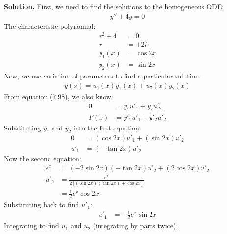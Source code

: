 \documentclass{article}
\begin{document}
\textbf{Solution.} First, we need to find the solutions to the homogeneous ODE:
\begin{equation*}
\begin{aligned}
	y'' + 4y = 0
\end{aligned}
\end{equation*}
The characteristic polynomial:
\begin{equation*}
\begin{aligned}
	r^2 + 4 &= 0 \\
	r &= \pm 2i \\
	y_1(x) &= \cos 2x \\
	y_2(x) &= \sin 2x
\end{aligned}
\end{equation*}
Now, we use variation of parameters to find a particular solution:
\begin{equation*}
\begin{aligned}
	y(x) = u_1(x)y_1(x) + u_2(x)y_2(x)
\end{aligned}
\end{equation*}
From equation (7.98), we also know:
\begin{equation*}
\begin{aligned}
	0 &= y_1u'_1 + y_2u'_2 \\
	F(x) &= y'_1u'_1 + y'_2u'_2
\end{aligned}
\end{equation*}
Substituting $y_1$ and $y_2$ into the first equation:
\begin{equation*}
\begin{aligned}
	0 &= (\cos 2x)u'_1 + (\sin 2x)u'_2 \\
	u'_1 &= (-\tan 2x)u'_2
\end{aligned}
\end{equation*}
Now the second equation:
\begin{equation*}
\begin{aligned}
	e^x &= (-2\sin 2x)(-\tan 2x)u'_2 + (2\cos 2x)u'_2 \\
	u'_2 &= \frac{e^x}{2\left[(\sin 2x)(\tan 2x)+\cos 2x\right]} \\
		&= \frac{1}{2}e^x \cos 2x
\end{aligned}
\end{equation*}
Substituting back to find $u'_1$:
\begin{equation*}
\begin{aligned}
	u'_1 &= -\frac{1}{2}e^x \sin 2x
\end{aligned}
\end{equation*}
Integrating to find $u_1$ and $u_2$ (integrating by parts twice):
\end{document}
